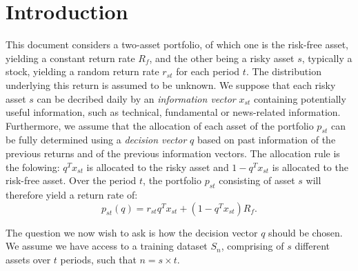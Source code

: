 \section{Introduction}
\label{sec:intro}

This document considers a two-asset portfolio, of which one is the risk-free asset,
yielding a constant return rate $R_f$, and the other being a risky asset $s$, typically a
stock, yielding a random return rate $r_{st}$ for each period $t$. The distribution
underlying this return is assumed to be unknown. We suppose that each risky asset $s$ can
be decribed daily by an \emph{information vector} $x_{st}$ containing potentially useful
information, such as technical, fundamental or news-related information. Furthermore, we
assume that the allocation of each asset of the portfolio $p_{st}$ can be fully determined
using a \emph{decision vector} $q$ based on past information of the previous returns and
of the previous information vectors. The allocation rule is the folowing: $q^Tx_{st}$ is
allocated to the risky asset and $1-q^Tx_{st}$ is allocated to the risk-free asset. Over
the period $t$, the portfolio $p_{st}$ consisting of asset $s$ will therefore yield a
return rate of:
\begin{equation}
  p_{st}(q) = r_{st}q^Tx_{st} + (1-q^Tx_{st})R_f.
\end{equation}

The question we now wish to ask is how the decision vector $q$ should be chosen. We assume
we have access to a training dataset $S_n$, comprising of $s$ different assets over
$t$ periods, such that
$n = s\times t$. 
